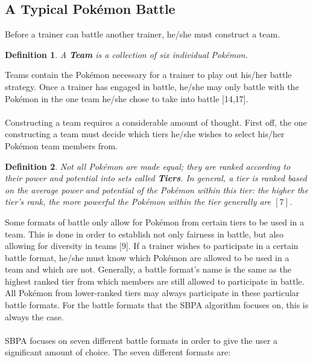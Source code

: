 \documentclass{article}
\newtheorem{definition}{Definition}
\begin{document}
\subsection{A Typical Pok\'emon Battle}\label{BattleFormatSection}
Before a trainer can battle another trainer, he/she must construct a team. 
\begin{definition}
	A \textbf{Team} is a collection of six individual Pok\'emon.
\end{definition}
Teams contain the Pok\'emon necessary for a trainer to play out his/her battle strategy. Once a trainer has engaged in battle, he/she may only battle with the Pok\'emon in the one team he/she chose to take into battle [14,17].\\\\
Constructing a team requires a considerable amount of thought. First off, the one constructing a team must decide which tiers he/she wishes to select his/her Pok\'emon team members from.
\begin{definition}\label{tierdef}
	Not all Pok\'emon are made equal; they are ranked according to their power and potential into sets called \textbf{Tiers}. In general, a tier is ranked based on the average power and potential of the Pok\'emon within this tier: the higher the tier's rank, the more powerful the Pok\'emon within the tier generally are $[7]$.
\end{definition} 
Some formats of battle only allow for Pok\'emon from certain tiers to be used in a team. This is done in order to establish not only fairness in battle, but also allowing for diversity in teams [9]. If a trainer wishes to participate in a certain battle format, he/she must know which Pok\'emon are allowed to be used in a team and which are not. Generally, a battle format's name is the same as the highest ranked tier from which members are still allowed to participate in battle. All Pok\'emon from lower-ranked tiers may always participate in these particular battle formats. For the battle formats that the SBPA algorithm focuses on, this is always the case.\\\\
SBPA focuses on seven different battle formats in order to give the user a significant amount of choice. The seven different formats are:
\end{document}
